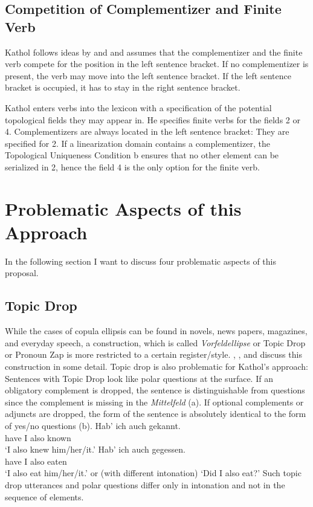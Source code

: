 \subsection{Competition of Complementizer and Finite Verb}

Kathol follows ideas by \citet{Thiersch78a} and \citet{denBesten83a} and assumes that
the complementizer and the finite verb compete for the position in the left sentence bracket. 
If no complementizer is present, the verb may move into the left sentence bracket. 
If the left sentence bracket is occupied, it has to stay in the right sentence bracket.

Kathol enters verbs into the lexicon with a specification of the potential topological fields they may appear
in. He specifies finite verbs for the fields 2 or 4. Complementizers are always located in the left sentence bracket:
They are specified for 2.
If a linearization domain contains a complementizer, the Topological Uniqueness Condition b ensures that
no other element can be serialized in 2, hence the field 4 is the only option for the finite verb.

\section{Problematic Aspects of this Approach}
\label{sec-problems}

In the following section I want to discuss four problematic aspects of this proposal.



\subsection{Topic Drop}

While the cases of copula ellipsis can be found in novels, news papers, magazines, and
everyday speech, a construction, which is called {\it Vor\-feld\-ellip\-se\/} or Topic Drop or Pronoun Zap is more
restricted to a certain register/style. 
\citet{Huang84}, \citet{Fries88b}, and \citet{Hoffmann97a}
discuss this construction in some detail.
Topic drop is also problematic for Kathol's approach:
Sentences with Topic Drop look like polar questions at the surface. If an obligatory
complement is dropped, the sentence is distinguishable from questions since the complement is
missing in the \textit{Mittelfeld} (a). If optional complements or adjuncts are dropped, the form of the sentence
is absolutely identical to the form of yes/no questions (b).
\eal
\ex 
\gll Hab' ich auch gekannt.\\
     have I   also known\\
\glt `I also knew him/her/it.'
\ex
\gll Hab' ich auch gegessen.\\
     have I   also eaten\\
\glt `I also eat him/her/it.' or (with different intonation) `Did I also eat?' 
\zl
Such topic drop utterances and polar questions differ
only in intonation and not in the sequence of elements.


